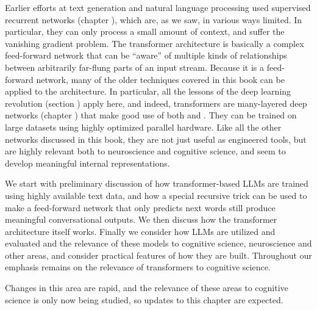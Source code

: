 
Earlier efforts at text generation and natural language processing used supervised recurrent networks (chapter ), which are, as we saw, in various ways limited. In particular, they can only process a small amount of context, and suffer the vanishing gradient problem. The transformer architecture is basically a complex feed-forward network that can be ``aware'' of multiple kinds of relationships between arbitrarily far-flung parts of an input stream. Because it is a feed-forward network, many of the older techniques covered in this book can be applied to the architecture. In particular, all the lessons of the deep learning revolution (section ) apply here, and indeed, transformers are many-layered deep networks (chapter ) that make good use of both  and . They can be trained on large datasets using highly optimized parallel hardware. Like all the other networks discussed in this book, they are not just useful as engineered tools, but are highly relevant both to neuroscience and cognitive science, and seem to develop meaningful internal representations. 

We start with preliminary discussion of how transformer-based LLMs are trained using highly available text data, and how a special recursive trick can be used to make a feed-forward network that only predicts next words still produce meaningful conversational outputs. We then discuss how the transformer architecture itself works. Finally we consider how LLMs are utilized and evaluated and the relevance of these models to cognitive science, neuroscience and other areas, and consider practical features of how they are built. Throughout our emphasis remains on the relevance of transformers to cognitive science.

Changes in this area are rapid, and the relevance of these areas to cognitive science is only now being studied, so updates to this chapter are expected.

